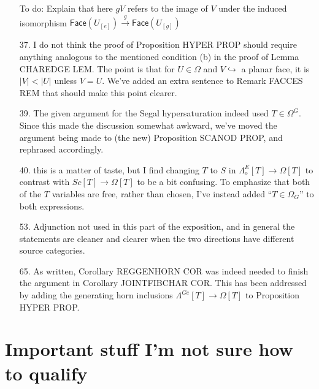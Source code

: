 \documentclass{article}
\begin{document}
\begin{itemize}
{\color{red} To do:} Explain that here $gV$ refers to the image of $V$ under the induced isomorphism 
$\mathsf{Face}(U_{[e]}) \xrightarrow{g} \mathsf{Face}(U_{[g]})$


\item[37.] I do not think the proof of Proposition HYPER PROP should require anything analogous to the mentioned condition (b) in the proof of Lemma CHAREDGE LEM. The point is that for $U \in \Omega$ and $V \hookrightarrow$ a planar face, it is $|V|<|U|$ unless $V=U$. We've added an extra sentence to Remark FACCES REM that should make this point clearer.

\item[39.] The given argument for the Segal hypersaturation indeed used $T \in \Omega^G$. Since this made the discussion somewhat awkward, we've moved the argument being made to (the  new) Proposition SCANOD PROP, and rephrased accordingly.



\item[40.] this is a matter of taste, but I find changing $T$ to $S$ in $\Lambda^E_o[T] \to \Omega[T]$ to contrast with $Sc[T] \to \Omega[T]$ to be a bit confusing. To emphasize that both of the $T$ variables are free, rather than chosen, I've instead added ``$T\in \Omega_G$'' to both expressions.

\item[53.] Adjunction not used in this part of the exposition, and in general the statements are cleaner and clearer when the two directions have different source categories.

\item[65.] As written, Corollary REGGENHORN COR was indeed needed to finish the argument in Corollary JOINTFIBCHAR COR. This has been addressed by adding the generating horn inclusions $\Lambda^{Ge}[T] \to \Omega[T]$ to Proposition HYPER PROP.


\end{itemize}



\section{Important stuff I'm not sure how to qualify}
\end{document}
